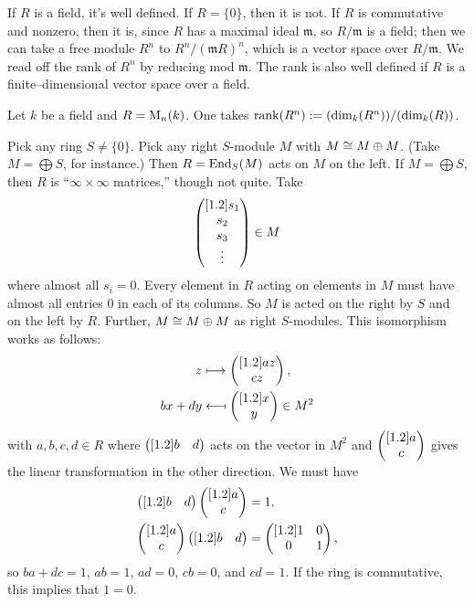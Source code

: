 \documentclass[11pt, oneside,margin=1in]{article}
\begin{document}
If $R$ is a field, it's well defined. If $R=\{0\}$, then it is not. If $R$ is commutative and nonzero, then it is, since $R$ has a maximal ideal $  \mathfrak{m}$, so 
$R/\mathfrak{m}$ is a field; then we can take a free module $R^n$ to $R^n/(\mathfrak{m}R) ^n$, which is a vector space over $R/\mathfrak{m}$. We read off the rank of $R^n$ by reducing mod $ \mathfrak{m}$.
The rank is also well defined if $R$ is a finite--dimensional vector space over a field.
\begin{example}\label{}
Let $k$ be a field and  $R=\operatorname{M}_n(k)$. One takes  $\operatorname{rank}(R^n) := (\dim_k(R^n))/(\dim_k(R))$.
\end{example}
\begin{example}\label{}
Pick any ring $S\ne\{0\}$. Pick any right $S$-module $M$ with $M\cong M\oplus M$. (Take $M=\bigoplus S$, for instance.) Then $R = \operatorname{End}_S(M)$ acts on $M$ on the left. If $M = \bigoplus S$, then $R$ is ``$\infty\times\infty$ matrices,'' though not quite. Take \begin{align*}
	\begin{pmatrix} [ 1.2 ] s_1\\s_2\\s_3\\ \vdots\end{pmatrix} \in M
\end{align*}
where almost all $s_i=0$. Every element in $R$ acting on elements in $M$ must have almost all entries $0$ in each of its columns. So $M$ is acted on the right by $S$ and on the left by $R$. Further, $M\cong M\oplus M$ as right $S$-modules. This isomorphism works as follows:
\begin{align*}
	z&\longmapsto\begin{pmatrix} [ 1.2 ] az\\cz\end{pmatrix},\\
	bx+dy &\longmapsfrom \begin{pmatrix} [ 1.2 ] x\\y\end{pmatrix}\in M^2
\end{align*}
with $a,b,c,d\in R$ where $\begin{pmatrix} [ 1.2 ] b&d\end{pmatrix}$ acts on the vector in $M^2$ and $\begin{pmatrix} [ 1.2 ] a\\c\end{pmatrix}$ gives the linear transformation in the other direction. We must have \begin{align*}
	\begin{pmatrix} [ 1.2 ] b&d\end{pmatrix} \begin{pmatrix} [ 1.2 ] a\\c\end{pmatrix}& =1,\\ \begin{pmatrix} [ 1.2 ] a\\c\end{pmatrix}\begin{pmatrix} [ 1.2 ] b&d\end{pmatrix}& = \begin{pmatrix} [ 1.2 ] 1&0\\0&1\end{pmatrix},
\end{align*}
so $ba+dc=1$, $ab=1$, $ad=0$, $cb=0$, and $cd=1$. If the ring is commutative, this implies that $1=0$. 
\end{example}
\end{document}
